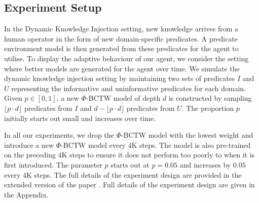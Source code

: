 \documentclass[letterpaper]{article} %
\theoremstyle{definition}
\begin{document}
\subsection{Experiment Setup}
In the Dynamic Knowledge Injection setting, new knowledge arrives from a human operator in the form of new domain-specific predicates. A predicate environment model is then generated from these predicates for the agent to utilise.
To display the adaptive behaviour of our agent, we consider the setting where better models are generated for the agent over time. 
We simulate the dynamic knowledge injection setting by maintaining two sets of predicates $I$ and $U$ representing the informative and uninformative predicates for each domain. Given $p \in [0, 1]$, a new $\Phi$-BCTW model of depth $d$ is constructed by sampling $\lfloor p \cdot d \rfloor$ predicates from $I$ and $d - \lfloor p \cdot d \rfloor$ predicates from $U$. The proportion $p$ initially starts out small and increases over time.

In all our experiments, we drop the $\Phi$-BCTW model with the lowest weight and introduce a new $\Phi$-BCTW model every $4$K steps. The model is also pre-trained on the preceding $4$K steps to ensure it does not perform too poorly to when it is first introduced. The parameter $p$ starts out at $p = 0.05$ and increases by $0.05$ every $4$K steps. 
\ifpaper
The full details of the experiment design are provided in the extended version of the paper \cite{yang2023dynamic}.
\fi
\ifarxiv
Full details of the experiment design are given in the Appendix.
\fi
\end{document}
